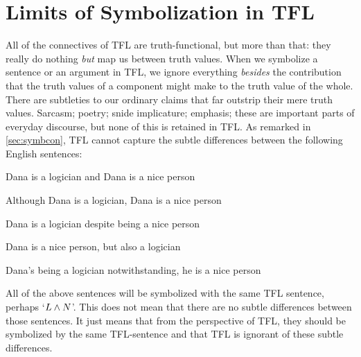 %

\section{Limits of Symbolization in TFL}
All of the connectives of TFL are truth-functional, but more than that: they really do nothing \emph{but} map us between truth values. When we symbolize a sentence or an argument in TFL, we ignore everything \emph{besides} the contribution that the truth values of a component might make to the truth value of the whole. There are subtleties to our ordinary claims that far outstrip their mere truth values. Sarcasm; poetry; snide implicature; emphasis; these are important parts of everyday discourse, but none of this is retained in TFL. As remarked in \cref{sec:symbcon}, TFL cannot capture the subtle differences between the following English sentences:
	\begin{compactlist}
		\item Dana is a logician and Dana is a nice person
		\item Although Dana is a logician, Dana is a nice person
		\item Dana is a logician despite being a nice person
		\item Dana is a nice person, but also a logician
		\item Dana's being a logician notwithstanding, he is a nice person
	\end{compactlist}
All of the above sentences will be symbolized with the same TFL sentence, perhaps `$L \mathbin{\wedge} N$'. This does not mean that there are no subtle differences between those sentences. It just means that from the perspective of TFL, they should be symbolized by the same TFL-sentence and that TFL is ignorant of these subtle differences.

